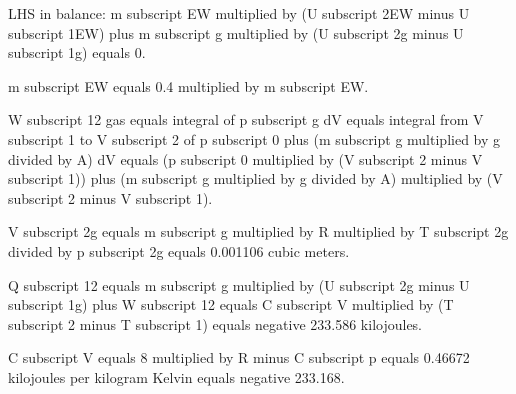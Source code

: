 LHS in balance:  
m subscript EW multiplied by (U subscript 2EW minus U subscript 1EW) plus m subscript g multiplied by (U subscript 2g minus U subscript 1g) equals 0.  

m subscript EW equals 0.4 multiplied by m subscript EW.  

W subscript 12 gas equals integral of p subscript g dV equals integral from V subscript 1 to V subscript 2 of p subscript 0 plus (m subscript g multiplied by g divided by A) dV equals (p subscript 0 multiplied by (V subscript 2 minus V subscript 1)) plus (m subscript g multiplied by g divided by A) multiplied by (V subscript 2 minus V subscript 1).  

V subscript 2g equals m subscript g multiplied by R multiplied by T subscript 2g divided by p subscript 2g equals 0.001106 cubic meters.  

Q subscript 12 equals m subscript g multiplied by (U subscript 2g minus U subscript 1g) plus W subscript 12 equals C subscript V multiplied by (T subscript 2 minus T subscript 1) equals negative 233.586 kilojoules.  

C subscript V equals 8 multiplied by R minus C subscript p equals 0.46672 kilojoules per kilogram Kelvin equals negative 233.168.